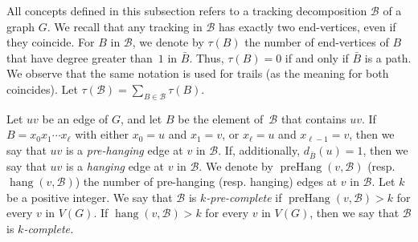 \documentclass[12pt,reqno,a4paper]{amsart}
\DeclareMathOperator{\prehang}{preHang}
\DeclareMathOperator{\hang}{hang}
\newcommand{\B}{\mathcal{B}}
\begin{document}

All concepts defined in this subsection refers to a tracking
decomposition \(\B\)
of a graph $G$. We recall that any tracking in \(\B\)
has exactly two end-vertices, even if they coincide. For \(B\)
in \(\B\),
we denote by \(\tau(B)\)
the number of end-vertices of \(B\)
that have degree greater than~$1$ in \(\bar B\).
Thus, \(\tau(B) = 0\)
if and only if \(\bar B\)
is a path.  We observe that the same notation is used for trails (as
the meaning for both coincides).  Let
\(\tau(\B) = \sum_{B\in\B}\tau(B)\).


Let \(uv\) be an edge of $G$, and let \(B\) be the element of~\(\B\) that contains \(uv\).
If \(B = x_0x_1\cdots x_\ell\) 
with either \(x_0 = u\) and \(x_1=v\), or \(x_\ell = u\) and \(x_{\ell-1} = v\), 
then we say that \(uv\) is a  
\emph{pre-hanging} edge at \(v\) in 
\(\B\). If, additionally,  \(d_{\bar B}(u) = 1\), then we say that \(uv\) is a 
\emph{hanging}
edge at \(v\) in $\B$. We denote by \({\prehang}(v,\B)\)
(resp. \({\hang}(v,\B)\)) the number of pre-hanging (resp. hanging) edges 
at \(v\) in \(\B\). 
%
%
%
%
%
%
Let \(k\) be a positive integer.
We say that \(\B\) is \emph{\(k\)-pre-complete} 
if \({\prehang}(v,\B) > k\)
for every \(v\) in \(V(G)\). If \({\hang}(v,\B) > k\)
for every \(v\) in \(V(G)\), then we say that \(\B\) is \emph{\(k\)-complete.}
\end{document}
